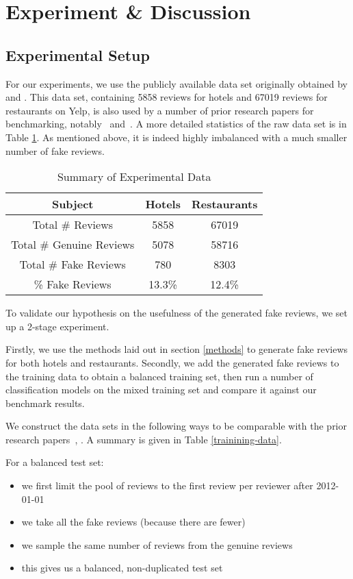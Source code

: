 \documentclass[conference, 11pt]{IEEEtran} %
\theoremstyle{plain}
\theoremstyle{definition}
\begin{document}
\section{Experiment \& Discussion}
\label{exp}

\subsection{Experimental Setup}
For our experiments, we use the publicly available data set originally obtained by \cite{mukherjee2013fake} and \cite{mukherjee2013yelp}.
This data set, containing 5858 reviews for hotels and 67019 reviews for restaurants on Yelp, is also used by a number of prior research papers for benchmarking, notably~\cite{wang2017handling} and~\cite{Tang2020}.
 A more detailed statistics of the raw data set is in Table \ref{original-data}. As mentioned above, it is indeed highly imbalanced with a much smaller number of fake reviews.

\begin{table}[h!]
\small
\caption{Summary of Experimental Data}
\centering
\begin{tabular}{|c|c|c|}
\hline
Subject & Hotels & Restaurants \\ \hline
Total \# Reviews & 5858 & 67019 \\ \hline
Total \# Genuine Reviews & 5078 & 58716 \\ \hline
Total \# Fake Reviews & 780 &  8303 \\ \hline
\% Fake Reviews & 13.3\% & 12.4\%  \\ 
\hline
\end{tabular}
\label{original-data}

\end{table}

To validate our hypothesis on the usefulness of the generated fake reviews, we set up a 2-stage experiment.

Firstly, we use the methods laid out in section \ref{methods} to generate fake reviews for both hotels and restaurants. Secondly, we add the generated fake reviews to the training data to obtain a balanced training set, then run a number of classification models on the mixed training set and compare it against our benchmark results.

We construct the data sets in the following ways to be comparable with the prior research papers~\cite{wang2017handling}, \cite{Tang2020}. A summary is given in Table \ref{trainining-data}.

For a balanced test set:
\begin{itemize}
\setlength\itemsep{0em}
\item we first limit the pool of reviews to the first review per reviewer after 2012-01-01
\item we take all the fake reviews (because there are fewer)
\item we sample the same number of reviews from the genuine reviews
\item this gives us a balanced, non-duplicated test set
\end{itemize}
\end{document}
